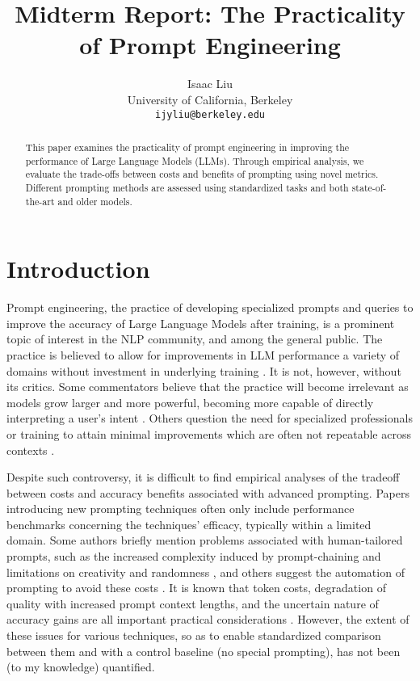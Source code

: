\documentclass[11pt]{article}
\title{Midterm Report: The Practicality of Prompt Engineering}
\author{Isaac Liu \\
  University of California, Berkeley \\
  \texttt{ijyliu@berkeley.edu}}
\begin{document}
\maketitle
\begin{abstract}
  This paper examines the practicality of prompt engineering in improving the performance of Large Language Models (LLMs). Through empirical analysis, we evaluate the trade-offs between costs and benefits of prompting using novel metrics. Different prompting methods are assessed using standardized tasks and both state-of-the-art and older models.
\end{abstract}

\section*{Introduction}

Prompt engineering, the practice of developing specialized prompts and queries to improve the accuracy of Large Language Models after training, is a prominent topic of interest in the NLP community, and among the general public. The practice is believed to allow for improvements in LLM performance a variety of domains without investment in underlying training \cite{martineau_what_2021}. It is not, however, without its critics. Some commentators believe that the practice will become irrelevant as models grow larger and more powerful, becoming more capable of directly interpreting a user's intent \cite{ethan_mollick_emollick_i_2023}. Others question the need for specialized professionals or training to attain minimal improvements which are often not repeatable across contexts \cite{shackell_prompt_2023, acar_ai_2023}. 

Despite such controversy, it is difficult to find empirical analyses of the tradeoff between costs and accuracy benefits associated with advanced prompting. Papers introducing new prompting techniques often only include performance benchmarks concerning the techniques' efficacy, typically within a limited domain. Some authors briefly mention problems associated with human-tailored prompts, such as the increased complexity induced by prompt-chaining and limitations on creativity and randomness \cite{wu_ai_2022}, and others suggest the automation of prompting to avoid these costs \cite{diao_active_2023}. It is known that token costs, degradation of quality with increased prompt context lengths, and the uncertain nature of accuracy gains are all important practical considerations \cite{gao_prompt_2023}. However, the extent of these issues for various techniques, so as to enable standardized comparison between them and with a control baseline (no special prompting), has not been (to my knowledge) quantified.
\end{document}
